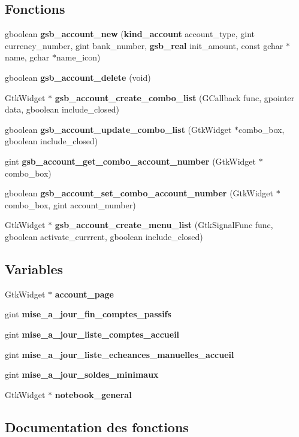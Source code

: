 \subsection*{Fonctions}
\begin{DoxyCompactItemize}
\item 
gboolean {\bf gsb\_\-account\_\-new} ({\bf kind\_\-account} account\_\-type, gint currency\_\-number, gint bank\_\-number, {\bf gsb\_\-real} init\_\-amount, const gchar $\ast$name, gchar $\ast$name\_\-icon)
\item 
gboolean {\bf gsb\_\-account\_\-delete} (void)
\item 
GtkWidget $\ast$ {\bf gsb\_\-account\_\-create\_\-combo\_\-list} (GCallback func, gpointer data, gboolean include\_\-closed)
\item 
gboolean {\bf gsb\_\-account\_\-update\_\-combo\_\-list} (GtkWidget $\ast$combo\_\-box, gboolean include\_\-closed)
\item 
gint {\bf gsb\_\-account\_\-get\_\-combo\_\-account\_\-number} (GtkWidget $\ast$combo\_\-box)
\item 
gboolean {\bf gsb\_\-account\_\-set\_\-combo\_\-account\_\-number} (GtkWidget $\ast$combo\_\-box, gint account\_\-number)
\item 
GtkWidget $\ast$ {\bf gsb\_\-account\_\-create\_\-menu\_\-list} (GtkSignalFunc func, gboolean activate\_\-currrent, gboolean include\_\-closed)
\end{DoxyCompactItemize}
\subsection*{Variables}
\begin{DoxyCompactItemize}
\item 
GtkWidget $\ast$ {\bf account\_\-page}
\item 
gint {\bf mise\_\-a\_\-jour\_\-fin\_\-comptes\_\-passifs}
\item 
gint {\bf mise\_\-a\_\-jour\_\-liste\_\-comptes\_\-accueil}
\item 
gint {\bf mise\_\-a\_\-jour\_\-liste\_\-echeances\_\-manuelles\_\-accueil}
\item 
gint {\bf mise\_\-a\_\-jour\_\-soldes\_\-minimaux}
\item 
GtkWidget $\ast$ {\bf notebook\_\-general}
\end{DoxyCompactItemize}


\subsection{Documentation des fonctions}
